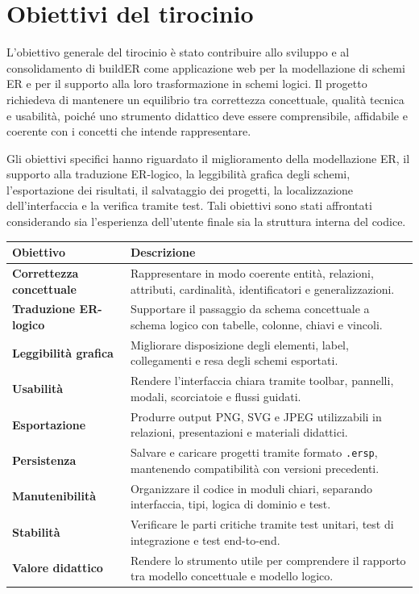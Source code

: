 \documentclass{unipd-thesis-modern}
\newcommand{\builder}{buildER}
\begin{document}
\chapter{Obiettivi del tirocinio}

L'obiettivo generale del tirocinio è stato contribuire allo sviluppo e al consolidamento di \builder{} come applicazione web per la modellazione di schemi ER e per il supporto alla loro trasformazione in schemi logici. Il progetto richiedeva di mantenere un equilibrio tra correttezza concettuale, qualità tecnica e usabilità, poiché uno strumento didattico deve essere comprensibile, affidabile e coerente con i concetti che intende rappresentare.

Gli obiettivi specifici hanno riguardato il miglioramento della modellazione ER, il supporto alla traduzione ER-logico, la leggibilità grafica degli schemi, l'esportazione dei risultati, il salvataggio dei progetti, la localizzazione dell'interfaccia e la verifica tramite test. Tali obiettivi sono stati affrontati considerando sia l'esperienza dell'utente finale sia la struttura interna del codice.

\noindent\begin{tabularx}{\textwidth}{>{\bfseries}p{4cm}X}
Obiettivo & Descrizione \\
\hline
Correttezza concettuale & Rappresentare in modo coerente entità, relazioni, attributi, cardinalità, identificatori e generalizzazioni. \\
Traduzione ER-logico & Supportare il passaggio da schema concettuale a schema logico con tabelle, colonne, chiavi e vincoli. \\
Leggibilità grafica & Migliorare disposizione degli elementi, label, collegamenti e resa degli schemi esportati. \\
Usabilità & Rendere l'interfaccia chiara tramite toolbar, pannelli, modali, scorciatoie e flussi guidati. \\
Esportazione & Produrre output PNG, SVG e JPEG utilizzabili in relazioni, presentazioni e materiali didattici. \\
Persistenza & Salvare e caricare progetti tramite formato \texttt{.ersp}, mantenendo compatibilità con versioni precedenti. \\
Manutenibilità & Organizzare il codice in moduli chiari, separando interfaccia, tipi, logica di dominio e test. \\
Stabilità & Verificare le parti critiche tramite test unitari, test di integrazione e test end-to-end. \\
Valore didattico & Rendere lo strumento utile per comprendere il rapporto tra modello concettuale e modello logico. \\
\end{tabularx}
\end{document}
